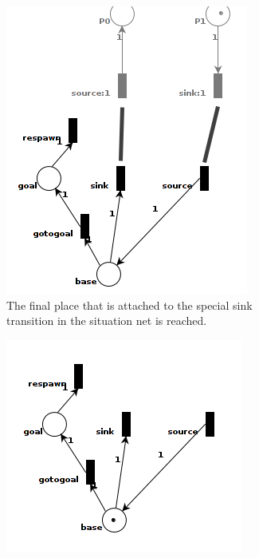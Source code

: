 \documentclass[11pt, a4paper]{book}
\begin{document}
\begin{figure}
\begin{subfigure}[b]{0.4\textwidth}
\includegraphics[width =\textwidth]{petrinet_pictures/fireback.png}
\caption{The final place that is attached to the special sink transition in the situation net is reached.}
\end{subfigure}
\hspace{.1\textwidth}
\begin{subfigure}[b]{0.4\textwidth}
\includegraphics[width =\textwidth]{petrinet_pictures/rotterdamPedestrianNet_sinksource.png}

\end{subfigure}
\end{figure}
\end{document}
